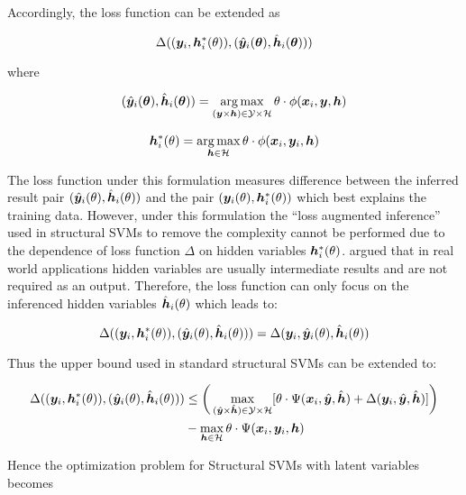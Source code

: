 Accordingly, the loss function can be extended as

$$
\Delta(({\bm{y}}_i,{\bm{h}}^*_i(\theta)),(\hat{{\bm{y}}}_i({\bm{\theta}}),\hat{{\bm{h}}}_i({\bm{\theta}})))
$$

\noindent where

\begin{align}
  \label{eq:latentssvm_full_inf}
 (\hat{{\bm{y}}}_i({\bm{\theta}}),\hat{{\bm{h}}}_i({\bm{\theta}}))=\operatorname*{arg\,max}_{({\bm{y}}
  \times {\bm{h}}) \in \mathcal{Y} \times \mathcal{H}}
\theta\cdot\phi({\bm{x}}_i,{\bm{y}},{\bm{h}})
\end{align}

\begin{align}
  \label{eq:latentssvm_latent_inf}
  {\bm{h}}^*_i(\theta) = \operatorname*{arg\,max}_{{\bm{h}} \in \mathcal{H}} \theta \cdot
  \phi({\bm{x}}_i,{\bm{y}}_i,{\bm{h}})
\end{align}

The loss function under this formulation measures difference
between the inferred result pair $(\hat{{\bm{y}}}_i(\theta),
\hat{{\bm{h}}}_i(\theta))$ and the pair $({\bm{y}}_i(\theta),
{\bm{h}}_i^*(\theta))$ which best explains the training data.
However, under this formulation the ``loss augmented inference''
used in structural SVMs\cite{tsochantaridis2005large} to remove
the complexity cannot be performed due to the dependence of loss
function $\Delta$ on hidden variables ${\bm{h}}^*_i(\theta)$.
 argued that in real world applications
hidden variables are usually intermediate results and are not
required as an output\cite{yu2009learning}. Therefore, the loss
function can only focus on the inferenced hidden variables
$\hat{{\bm{h}}}_i(\theta)$ which leads to:

$$
\Delta(({\bm{y}}_i,{\bm{h}}^*_i(\theta)),(\hat{{\bm{y}}}_i(\theta),\hat{{\bm{h}}}_i(\theta)))
=
\Delta({\bm{y}}_i,\hat{{\bm{y}}}_i(\theta),\hat{{\bm{h}}}_i(\theta))
$$

Thus the upper bound used in standard structural
SVMs\cite{tsochantaridis2005large} can be extended to:

\begin{align}
  \Delta(({\bm{y}}_i,{\bm{h}}^*_i(\theta)),(\hat{{\bm{y}}}_i(\theta),\hat{{\bm{h}}}_i(\theta)))
  &\leq \bigg(\max_{(\hat{{\bm{y}}} \times \hat{{\bm{h}}}) \in
    \mathcal{Y} \times \mathcal{H}}
    [\theta\cdot\Psi({\bm{x}}_i,\hat{{\bm{y}}},\hat{{\bm{h}}}) +
    \Delta({\bm{y}}_i,\hat{{\bm{y}}},\hat{{\bm{h}}})]\bigg)\\
  &-\max_{{\bm{h}} \in \mathcal{H}} \theta \cdot
    \Psi({\bm{x}}_i,{\bm{y}}_i,{\bm{h}})
\end{align}

Hence the optimization problem for Structural SVMs with latent
variables becomes

